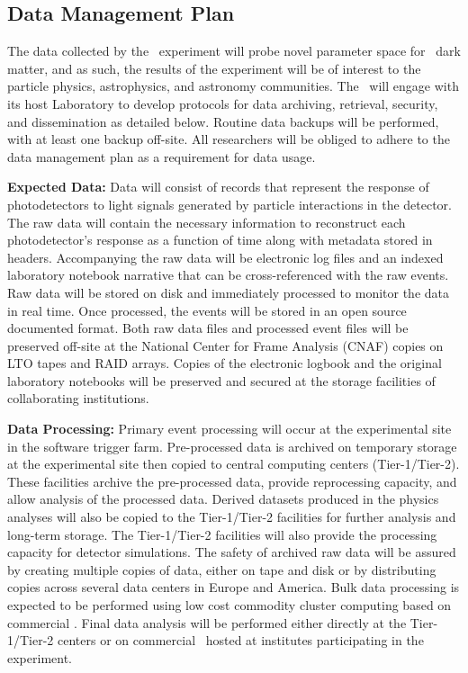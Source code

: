 \subsection{Data Management Plan}

The data collected by the \DSks\ experiment will probe novel parameter space for \WIMP\ dark matter, and as such, the results of the experiment will be of interest to the particle physics, astrophysics, and astronomy communities. The \GADMC\ will engage with its host Laboratory to develop protocols for data archiving, retrieval, security, and dissemination as detailed below.  Routine data backups will be performed, with at least one backup off-site. All researchers will be obliged to adhere to the data management plan as a requirement for data usage.

{\bf Expected Data:} Data will consist of records that represent the response of photodetectors to light signals generated by particle interactions in the detector. The raw data will contain the necessary information to reconstruct each photodetector's response as a function of time along with metadata stored in headers. Accompanying the raw data will be electronic log files and an indexed laboratory notebook narrative that can be cross-referenced with the raw events.  Raw data will be stored on disk and immediately processed to monitor the data in real time.  Once processed, the events will be stored in an open source documented format.  Both raw data files and processed event files will be preserved off-site at the National Center for Frame Analysis (CNAF) copies on LTO tapes and RAID arrays.  Copies of the electronic logbook and the original laboratory notebooks will be preserved and secured at the storage facilities of collaborating institutions.

{\bf Data Processing:} Primary event processing will occur at the experimental site in the software trigger farm. Pre-processed data is archived on temporary storage at the experimental site then copied to central computing centers (Tier-1/Tier-2). These facilities archive the pre-processed data, provide reprocessing capacity, and allow analysis of the processed data. Derived datasets produced in the physics analyses will also be copied to the Tier-1/Tier-2 facilities for further analysis and long-term storage. The Tier-1/Tier-2 facilities will also provide the processing capacity for detector simulations. The safety of archived raw data will be assured by creating multiple copies of data, either on tape and disk or by distributing copies across several data centers in Europe and America. Bulk data processing is expected to be performed using low cost commodity cluster computing based on commercial \CPUs.  Final data analysis will be performed either directly at the Tier-1/Tier-2 centers or on commercial \CPUs\ hosted at institutes participating in the experiment.  

